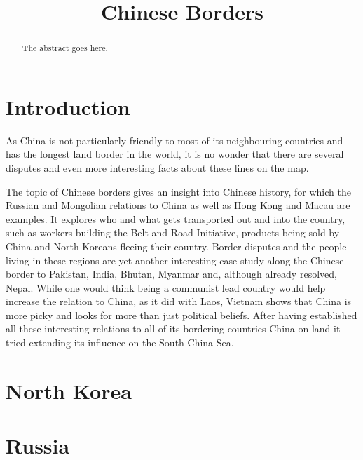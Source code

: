 \documentclass[conference]{IEEEtran}
\begin{document}
	
	\title{Chinese Borders}
	
	\author{
	}
	
	\maketitle
	
	\begin{abstract}
		The abstract goes here.
	\end{abstract}
	
	\section{Introduction}
	As China is not particularly friendly to most of its neighbouring countries and has the longest land border in the world, it is no wonder that there are several disputes and even more interesting facts about these lines on the map.
	
	The topic of Chinese borders gives an insight into Chinese history, for which the Russian and Mongolian relations to China as well as Hong Kong and Macau are examples. It explores who and what gets transported out and into the country, such as workers building the Belt and Road Initiative, products being sold by China and North Koreans fleeing their country. Border disputes and the people living in these regions are yet another interesting case study along the Chinese border to Pakistan, India, Bhutan, Myanmar and, although already resolved, Nepal. While one would think being a communist lead country would help increase the relation to China, as it did with Laos, Vietnam shows that China is more picky and looks for more than just political beliefs. After having established all these interesting relations to all of its bordering countries China on land it tried extending its influence on the South China Sea. 
	
	\section{North Korea}
	
	\section{Russia}
	
\end{document}
